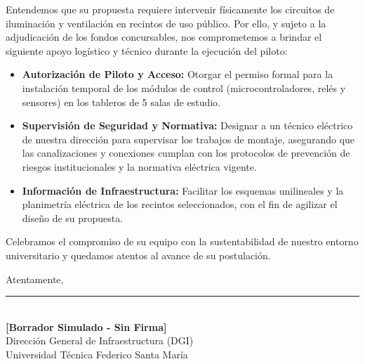 \vspace{0.3cm}

\noindent Entendemos que su propuesta requiere intervenir físicamente los circuitos de iluminación y ventilación en recintos de uso público. Por ello, y sujeto a la adjudicación de los fondos concursables, nos comprometemos a brindar el siguiente apoyo logístico y técnico durante la ejecución del piloto:

\begin{itemize}
    \item \textbf{Autorización de Piloto y Acceso:} Otorgar el permiso formal para la instalación temporal de los módulos de control (microcontroladores, relés y sensores) en los tableros de 5 salas de estudio.
    \item \textbf{Supervisión de Seguridad y Normativa:} Designar a un técnico eléctrico de nuestra dirección para supervisar los trabajos de montaje, asegurando que las canalizaciones y conexiones cumplan con los protocolos de prevención de riesgos institucionales y la normativa eléctrica vigente.
    \item \textbf{Información de Infraestructura:} Facilitar los esquemas unilineales y la planimetría eléctrica de los recintos seleccionados, con el fin de agilizar el diseño de su propuesta.
\end{itemize}

\vspace{0.3cm}

\noindent Celebramos el compromiso de su equipo con la sustentabilidad de nuestro entorno universitario y quedamos atentos al avance de su postulación.

\vspace{1cm}

\noindent Atentamente,

\vspace{2cm}

\begin{center}
\rule{7cm}{0.5pt}\\
\textbf{[Borrador Simulado - Sin Firma]}\\
\vspace{0.2cm}
Dirección General de Infraestructura (DGI)\\
Universidad Técnica Federico Santa María
\end{center}
